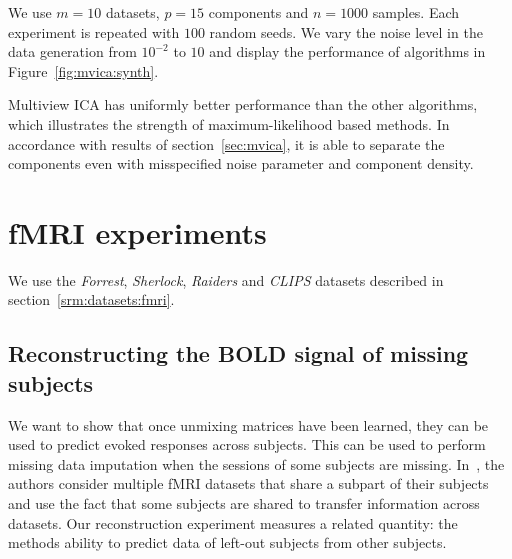 %
%
We use $m=10$ datasets, $p=15$ components and $n=1000$ samples. Each experiment is repeated with $100$ random seeds.
%
We vary the noise level in the data generation from $10^{-2}$ to $10$ and
display the performance of algorithms in Figure~\ref{fig:mvica:synth}.

Multiview ICA has uniformly better performance than the other algorithms, which illustrates the strength of maximum-likelihood based methods. In accordance with results of section~\ref{sec:mvica}, it is able to separate the components even with misspecified noise parameter and component density.
%


\section{fMRI experiments}
We use the \emph{Forrest}, \emph{Sherlock}, \emph{Raiders} and \emph{CLIPS} datasets described in section~\ref{srm:datasets:fmri}.

\subsection{Reconstructing the BOLD signal of missing subjects}
\label{sec:srm:reconstruction}
\label{reconstruction}
We want to show that once unmixing matrices have been learned, they can be
used to predict evoked responses across subjects. This can be used to perform
missing data imputation when the sessions of some subjects are missing.
In~\cite{zhang2018transfer}, the authors consider multiple fMRI datasets that
share a subpart of their subjects and use the fact that some subjects are shared
to transfer information across datasets. Our reconstruction experiment measures
a related quantity: the methods ability to predict data of left-out subjects
from other subjects.

